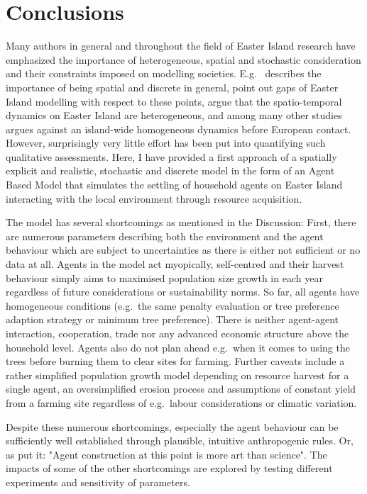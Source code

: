 
\chapter{Conclusions}

Many authors in general and throughout the field of Easter Island research have emphasized the importance of heterogeneous, spatial and stochastic consideration and their constraints imposed on modelling societies.
E.g.\ \citet{Bousquet2004} describes the importance of being spatial and discrete in general, \citet{Merico2017} point out gaps of Easter Island modelling with respect to these points, \citet{Rull2020} argue that the spatio-temporal dynamics on Easter Island are heterogeneous, and \citet{Steensonvenson2015} among many other studies argues against an island-wide homogeneous dynamics before European contact.
However, surprisingly very little effort has been put into quantifying such qualitative assessments.
Here, I have provided a first approach of a spatially explicit and realistic, stochastic and discrete model in the form of an Agent Based Model that simulates the settling of household agents on Easter Island interacting with the local environment through resource acquisition. 

The model has several shortcomings as mentioned in the Discussion:
First, there are numerous parameters describing both the environment and the agent behaviour which are subject to uncertainties as there is either not sufficient or no data at all.
Agents in the model act myopically, self-centred and their harvest behaviour simply aims to maximised population size growth in each year regardless of future considerations or sustainability norms. 
So far, all agents have homogeneous conditions (e.g.\ the same penalty evaluation or tree preference adaption strategy or minimum tree preference).
There is neither agent-agent interaction, cooperation, trade nor any advanced economic structure above the household level. 
Agents also do not plan ahead e.g.\ when it comes to using the trees before burning them to clear sites for farming.
Further caveats include a rather simplified population growth model depending on resource harvest for a single agent, an oversimplified erosion process and assumptions of constant yield from a farming site regardless of e.g.\ labour considerations or climatic variation.

Despite these numerous shortcomings, especially the agent behaviour can be sufficiently well established through plausible, intuitive anthropogenic rules.
Or, as \citet{Kohler2000} put it: "Agent construction at this point is more art than science".
The impacts of some of the other shortcomings are explored by testing different experiments and sensitivity of parameters.

